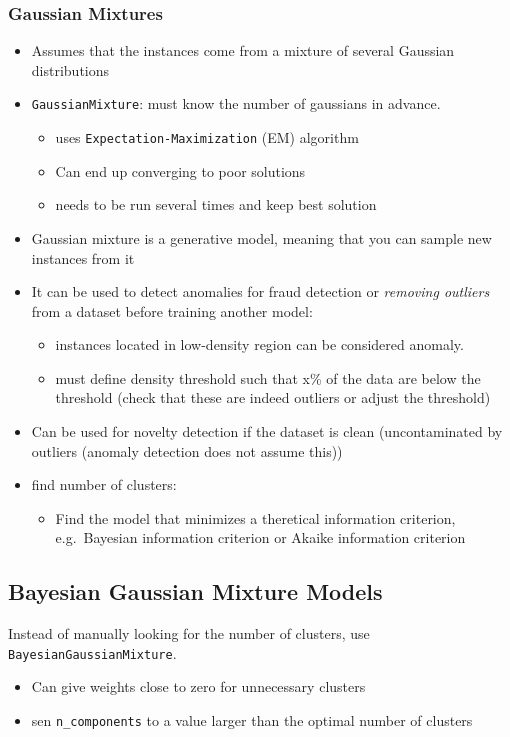 \subsubsection{Gaussian Mixtures}
\begin{itemize}
    \item Assumes that the instances come from a mixture of several Gaussian distributions
    \item \verb;GaussianMixture;: must know the number of gaussians in advance.
        \begin{itemize}
            \item uses \verb;Expectation-Maximization; (EM) algorithm
            \item Can end up converging to poor solutions
            \item[\arrow] needs to be run several times and keep best solution
        \end{itemize}
    \item Gaussian mixture is a generative model, meaning that you can sample new instances from it
    \item It can be used to detect anomalies for fraud detection or \textit{removing outliers} from a dataset before
        training another model:
        \begin{itemize}
            \item instances located in low-density region can be considered anomaly.
            \item[\arrow] must define density threshold such that x\% of the data are below the threshold (check that
                these are indeed outliers or adjust the threshold)
        \end{itemize}
    \item Can be used for novelty detection if the dataset is clean (uncontaminated by outliers (anomaly detection does
        not assume this))
    \item find number of clusters:
        \begin{itemize}
            \item Find the model that minimizes a theretical information criterion, e.g.\ Bayesian information criterion
                or Akaike information criterion
        \end{itemize}
\end{itemize}

\subsection{Bayesian Gaussian Mixture Models}
Instead of manually looking for the number of clusters, \arrow use \verb;BayesianGaussianMixture;.
\begin{itemize}
    \item Can give weights close to zero for unnecessary clusters
    \item sen \verb;n_components; to a value larger than the optimal number of clusters
\end{itemize}
